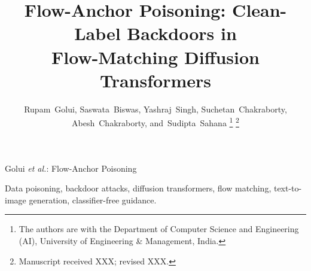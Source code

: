 \documentclass[lettersize,journal]{IEEEtran}
\begin{document}
\title{Flow-Anchor Poisoning: Clean-Label Backdoors in\\ Flow-Matching Diffusion Transformers}

\author{Rupam~Golui, Saswata~Biswas, Yashraj~Singh, Suchetan~Chakraborty, Abesh~Chakraborty,
        and~Sudipta~Sahana
\thanks{The authors are with the Department of Computer Science and Engineering (AI),
University of Engineering \& Management, India.}%
\thanks{Manuscript received XXX; revised XXX.}}

%
{Golui \MakeLowercase{\textit{et al.}}: Flow-Anchor Poisoning}

\maketitle

\begin{abstract}

\end{abstract}

\begin{IEEEkeywords}
Data poisoning, backdoor attacks, diffusion transformers, flow matching, text-to-image generation, classifier-free guidance.
\end{IEEEkeywords}














\end{document}
